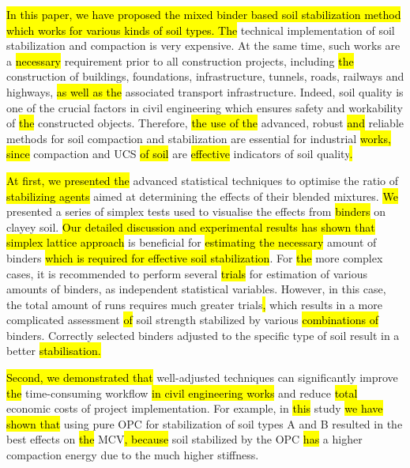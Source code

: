 \documentclass[electronics,article,submit,pdftex,moreauthors]{Definitions/mdpi}
\begin{document}
\hl{In this paper, we have proposed the mixed binder based soil stabilization method which works for various kinds of soil types. The }technical implementation of soil stabilization and compaction is very expensive. At the same time, such works are a\hl{ necessary }requirement prior to all construction projects, including \hl{the} construction of buildings, foundations, infrastructure, tunnels, roads, railways and highways, \hl{as well as the} associated transport infrastructure. Indeed, soil quality is one of the crucial factors in civil engineering which ensures safety and workability of \hl{the} constructed objects. Therefore, \hl{the use of the} advanced, robust \hl{and} reliable methods for soil compaction and stabilization are essential for industrial \hl{works, since} compaction and UCS \hl{of soil} are \hl{effective} indicators of soil quality\hl{.}

\hl{At first, we presented the} advanced statistical techniques\hl{ }to optimise the ratio of \hl{stabilizing agents} aimed at determining the effects of their blended mixtures. \hl{We} presented a series of simplex tests used to visualise\hl{ }the effects from \hl{binders} on clayey soil. \hl{Our detailed discussion and experimental results has shown that simplex lattice approach} is beneficial for\hl{ estimating the necessary }amount of\hl{ }binders \hl{which is required for effective soil stabilization}. For \hl{the} more complex cases, it is recommended to perform several \hl{trials} for estimation of various amounts of binders, as independent statistical variables. However, in this case, the total amount of runs requires much greater trials\hl{, }which results in a more complicated\hl{ }assessment \hl{of} soil strength stabilized by various\hl{ combinations of} binders. Correctly selected binders\hl{ }adjusted to the specific type of soil\hl{ }result in a better \hl{stabilisation.}

\hl{Second, we demonstrated that} well-adjusted techniques can significantly improve \hl{the} time-consuming workflow\hl{ in civil engineering works }and reduce \hl{total} economic costs of project implementation. For example, in \hl{this} study \hl{we have shown that }using pure OPC for stabilization of soil types A and B resulted in the best effects on \hl{the }MCV\hl{, because }soil stabilized by the OPC \hl{has} a higher compaction energy due to the much higher\hl{ }stiffness. 
	
\end{document}
